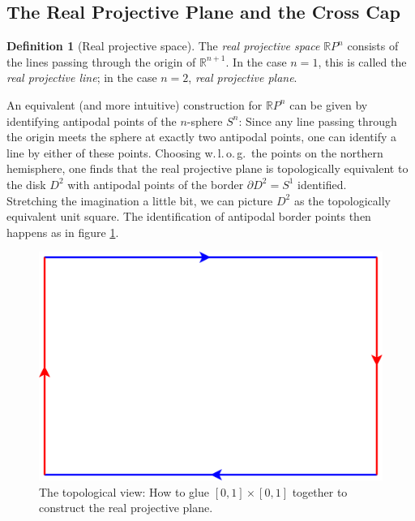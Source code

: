 \documentclass[11pt,            %
               a4paper,         %
               oneside,         %
               DIV12,           %
               fleqn,           %
               halfparskip,     %
               nochapterprefix, %
              ]{scrartcl} %
\theoremstyle{definition}
\newtheorem{definition}{Definition}
\begin{document}
\subsection{The Real Projective Plane and the Cross Cap}
\label{sec:rp2}

\begin{definition}[Real projective space]
  The \emph{real projective space} $\mathbb{R}P^n$ consists of the lines
  passing through the origin of $\mathbb{R}^{n+1}$. In the case $n=1$,
  this is called the \emph{real projective line}; in the case $n=2$,
  \emph{real projective plane}.
\end{definition}
%
\begin{minipage}[t]{0.57\textwidth}
  An equivalent (and more intuitive) construction for $\mathbb{R}P^n$
  can be given by identifying antipodal points of the $n$-sphere $S^n$: Since any
  line passing through the origin meets the sphere at exactly two
  antipodal points, one can identify a line by either of these points.
  Choosing w.\,l.\,o.\,g.~the points on the northern hemisphere,
  one finds that the real projective plane is topologically equivalent to
  the disk $D^2$ with antipodal points of the border $\partial D^2 =
  S^1$ identified.\\[1em]
  Stretching the imagination a little bit, we can picture $D^2$ as the
  topologically equivalent unit square. The identification of
  antipodal border points then happens as in figure \ref{fig:rp2}.
\end{minipage}%
\hfill%
\begin{minipage}[t]{0.35\textwidth}
  \vspace{-.7cm}%
  \begin{figure}[H]
    \centering
    \includegraphics[keepaspectratio=true,width=\textwidth]{../planar-graphs/crosscap-construction.pdf}
    \caption{The topological view: How to glue $[0,1]\times[0,1]$
      together to construct the real projective plane.}
    \label{fig:rp2}
  \end{figure}
\end{minipage}%
\end{document}
